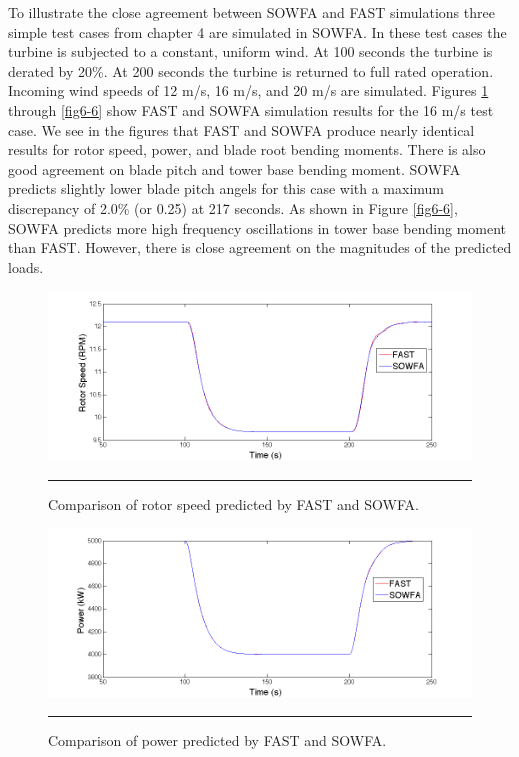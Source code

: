 To illustrate the close agreement between SOWFA and FAST simulations three simple test cases from chapter 4 are simulated in SOWFA. In these test cases the turbine is subjected to a constant, uniform wind. At 100 seconds the turbine is derated by 20\%. At 200 seconds the turbine is returned to full rated operation. Incoming wind speeds of 12 m/s, 16 m/s, and 20 m/s are simulated. Figures \ref{fig6-2} through \ref{fig6-6} show FAST and SOWFA simulation results for the 16 m/s test case. We see in the figures that FAST and SOWFA produce nearly identical results for rotor speed, power, and blade root bending moments. There is also good agreement on blade pitch and tower base bending moment. SOWFA predicts slightly lower blade pitch angels for this case with a maximum discrepancy of 2.0\% (or 0.25\degree) at 217 seconds. As shown in Figure \ref{fig6-6}, SOWFA predicts more high frequency oscillations in tower base bending moment than FAST. However, there is close agreement on the magnitudes of the predicted loads. 

\begin{figure}[htbp]	\label{fig6-2}
	\centering
		\includegraphics[trim = {1cm 0 2cm 0}, clip, width = \linewidth]{Figures/ch6Figures/fig6-2.png}
		\rule{35em}{0.5pt}
	\caption{Comparison of rotor speed predicted by FAST and SOWFA.}
\end{figure}

\begin{figure}[htbp]	\label{fig6-3}
	\centering
		\includegraphics[trim = {1cm 0 2cm 0}, clip, width = \linewidth]{Figures/ch6Figures/fig6-3.png}
		\rule{35em}{0.5pt}
	\caption{Comparison of power predicted by FAST and SOWFA.}
\end{figure}


